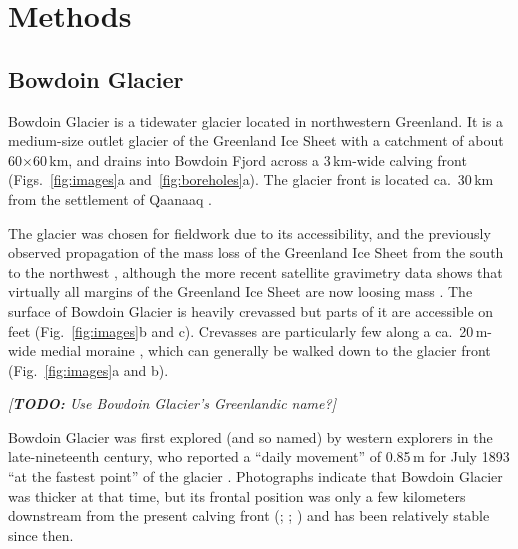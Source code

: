 \documentclass[utf8]{article}
\newcommand{\todo}[1]{\textcolor{c3}{\emph{[\textbf{TODO:} #1]}}}
\begin{document}
\section{Methods}

\subsection{Bowdoin Glacier}

    Bowdoin Glacier is a tidewater glacier located in northwestern Greenland.
    It is a medium-size outlet glacier of the Greenland Ice Sheet with a
    catchment of about 60$\times$60\,km, and drains into Bowdoin Fjord across a
    3\,km-wide calving front (Figs.~\ref{fig:images}a
    and~\ref{fig:boreholes}a). The glacier front is located ca.~30\,km from
    the settlement of Qaanaaq
    \citep[see Fig.~1 of][for a map]{Sugiyama.etal.2015}.

    The glacier was chosen for fieldwork due to its accessibility, and the
    previously observed propagation of the mass loss of the Greenland Ice Sheet
    from the south to the northwest \citep{Khan.etal.2010}, although the more
    recent satellite gravimetry
    data shows that virtually all margins of the Greenland Ice Sheet are now
    loosing mass \citep{Groh.Horwath.2016}. The surface of Bowdoin Glacier
    is heavily crevassed but parts of it are accessible on feet
    (Fig.~\ref{fig:images}b and c). Crevasses are
    particularly few along a ca.~20\,m-wide medial moraine
    \citep[Fig.~68 of][]{Chamberlin.1897}, which can generally be walked down
    to the glacier front (Fig.~\ref{fig:images}a and b).

    \todo{Use Bowdoin Glacier's Greenlandic name?}

    Bowdoin Glacier was first explored (and so named) by western explorers in
    the late-nineteenth century, who
    reported a ``daily movement'' of 0.85\,m for July 1893 ``at the
    fastest point'' of the glacier \citep{Chamberlin.1894}.
    Photographs indicate that Bowdoin Glacier was thicker at that time, but its
    frontal position was only a few kilometers downstream from the present
    calving front (\citealp[p.~668]{Chamberlin.1895}; \citealp[Figs.~64 and~65
    of][]{Chamberlin.1897}; \citealp[Fig.~1 of][]{Podolskiy.etal.2016}) and has
    been relatively stable since then.
\end{document}
